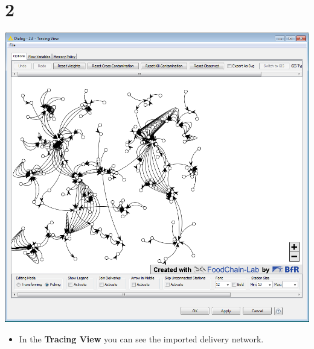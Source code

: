 \documentclass{beamer}
\begin{document}
\section{2}
\begin{frame}
	\begin{center}
  		\includegraphics[height=0.6\textheight]{2.png}
	\end{center}
	\begin{itemize}
		\item In the \textbf{Tracing View} you can see the imported delivery network.
	\end{itemize}
\end{frame}
\end{document}
